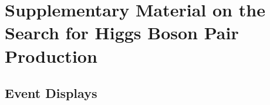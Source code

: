 \chapter{Supplementary Material on the Search for Higgs Boson Pair Production}

\section{Event Displays}















% 

